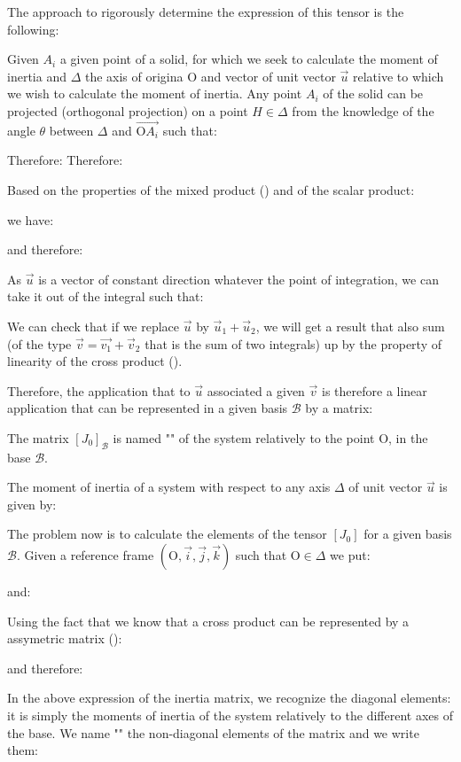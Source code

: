    The approach to rigorously determine the expression of this tensor is the following: 

   Given $A_i$ a given point of a solid, for which we seek to calculate the moment of inertia and $\Delta$ the axis of origina O and vector of unit vector $\vec{u}$ relative to which we wish to calculate the moment of inertia. Any point $A_i$ of the solid can be projected (orthogonal projection) on a point $H\in \Delta$ from the knowledge of the angle $\theta$ between $\Delta$ and $\overrightarrow{\text{O}A_i}$ such that:
    
   Therefore:
   Therefore:
   
   Based on the properties of the mixed product () and of the scalar product:
   
   we have:
   
   and therefore:
  
  As $\vec{u}$ is a vector of constant direction whatever the point of integration, we can take it out of the integral such that:
   
   We can check that if we replace $\vec{u}$ by $\vec{u}_1+\vec{u}_2$, we will get a result that also sum (of the type $\vec{v}=\vec{v_1}+\vec{v}_2$ that is the sum of two integrals) up by the property of linearity  of the cross product (). 

   Therefore, the application that to $\vec{u}$ associated a given $\vec{v}$ is therefore a linear application that can be represented in a given basis $\mathcal{B}$ by a matrix:
   
   The matrix $[J_0]_{\mathcal{B}}$ is named "" of the system relatively to the point O, in the base $\mathcal{B}$.

  The moment of inertia of a system with respect to any axis $\Delta$ of unit vector $\vec{u}$ is given by:
  
  The problem now is to calculate the elements of the tensor $[J_0]$ for a given basis $\mathcal{B}$. Given a reference frame $(\text{O},\vec{i},\vec{j},\vec{k})$ such that $\text{O} \in \Delta$ we put:
   
   and:
    
   Using the fact that we know that a cross product can be represented by a assymetric matrix ():
   
   and therefore:
   
	In the above expression of the inertia matrix, we recognize the diagonal elements: it is simply the moments of inertia of the system relatively to the different axes of the base. We name "" the non-diagonal elements of the matrix and we write them:
   
